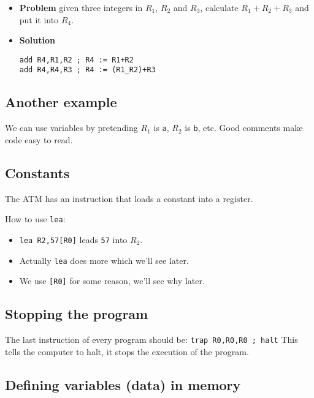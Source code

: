 \begin{itemize}
	\item \textbf{Problem} given three integers in \(R_1\), \(R_2\) and \(R_3\), calculate  \(R_1+R_2+R_3\) and put it into \(R_4\).
	\item \textbf{Solution}
	      \begin{verbatim}
add R4,R1,R2 ; R4 := R1+R2
add R4,R4,R3 ; R4 := (R1_R2)+R3
            \end{verbatim}
\end{itemize}

\subsection{Another example}\label{sub:another_example}

We can use variables by pretending \(R_1\) is  \texttt{a}, \(R_2\) is \texttt{b}, etc.
Good comments make code easy to read.

\subsection{Constants}\label{sub:constants}

The ATM has an instruction that loads a constant into a register.

How to use \texttt{lea}:
\begin{itemize}
	\item \texttt{lea R2,57[R0]} leads \texttt{57} into \(R_2\).
	\item Actually \texttt{lea} does more which we'll see later.
	\item We use \texttt{[R0]} for some reason, we'll see why later.
\end{itemize}

\subsection{Stopping the program}\label{sub:stopping_the_program}

The last instruction of every program should be: \texttt{trap R0,R0,R0 ; halt}
This tells the computer to halt, it stops the execution of the program.

\subsection{Defining variables (data) in memory}\label{sub:defining_variables_data_in_memory}

